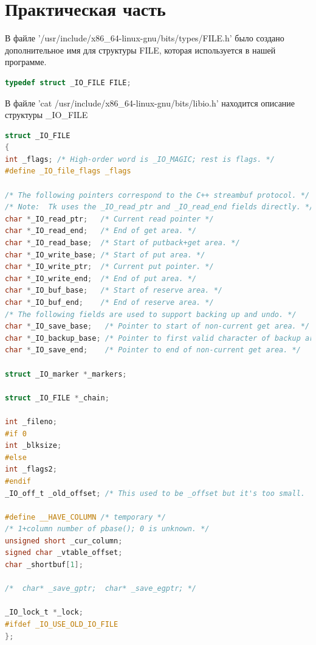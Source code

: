\documentclass[a4paper,oneside,12pt]{extreport}
\begin{document}


\section*{Практическая часть}
В файле '/usr/include/x86\_64-linux-gnu/bits/types/FILE.h' было создано дополнительное 
имя для структуры FILE, которая используется в нашей программе.
\begin{lstlisting}[language=C]
typedef struct _IO_FILE FILE;
\end{lstlisting}

В файле 'cat /usr/include/x86\_64-linux-gnu/bits/libio.h' находится описание структуры \_IO\_FILE
\begin{lstlisting}[language=C]
struct _IO_FILE
{
int _flags; /* High-order word is _IO_MAGIC; rest is flags. */
#define _IO_file_flags _flags

/* The following pointers correspond to the C++ streambuf protocol. */
/* Note:  Tk uses the _IO_read_ptr and _IO_read_end fields directly. */
char *_IO_read_ptr;   /* Current read pointer */
char *_IO_read_end;   /* End of get area. */
char *_IO_read_base;  /* Start of putback+get area. */
char *_IO_write_base; /* Start of put area. */
char *_IO_write_ptr;  /* Current put pointer. */
char *_IO_write_end;  /* End of put area. */
char *_IO_buf_base;   /* Start of reserve area. */
char *_IO_buf_end;    /* End of reserve area. */
/* The following fields are used to support backing up and undo. */
char *_IO_save_base;   /* Pointer to start of non-current get area. */
char *_IO_backup_base; /* Pointer to first valid character of backup area */
char *_IO_save_end;    /* Pointer to end of non-current get area. */

struct _IO_marker *_markers;

struct _IO_FILE *_chain;

int _fileno;
#if 0
int _blksize;
#else
int _flags2;
#endif
_IO_off_t _old_offset; /* This used to be _offset but it's too small.  */

#define __HAVE_COLUMN /* temporary */
/* 1+column number of pbase(); 0 is unknown. */
unsigned short _cur_column;
signed char _vtable_offset;
char _shortbuf[1];

/*  char* _save_gptr;  char* _save_egptr; */

_IO_lock_t *_lock;
#ifdef _IO_USE_OLD_IO_FILE
};
\end{lstlisting}
\newpage
\end{document}
